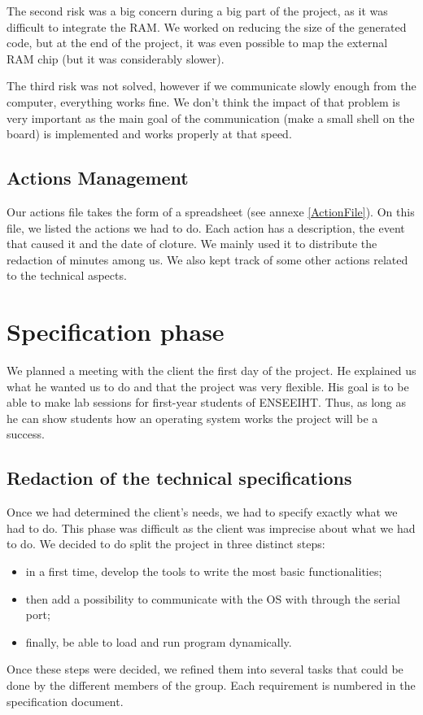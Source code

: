 \documentclass[openany, a4paper]{book}
\begin{document}
        The second risk was a big concern during a big part of the project, as
        it was difficult to integrate the RAM. We worked on reducing the size of
        the generated code, but at the end of the project, it was even possible
        to map the external RAM chip (but it was considerably slower).

        The third risk was not solved, however if we communicate slowly enough
        from the computer, everything works fine. We don't think the impact of
        that problem is very important as the main goal of the communication
        (make a small shell on the board) is implemented and works properly at
        that speed.

    \section{Actions Management}
    Our actions file takes the form of a spreadsheet (see annexe
    \ref{ActionFile}). On this file, we listed the actions we had to do. Each
    action has a description, the event that caused it and the date of cloture.
    We mainly used it to distribute the redaction of minutes among us. We also
    kept track of some other actions related to the technical aspects.

  \chapter{Specification phase}
    We planned a meeting with the client the first day of the project. He
    explained us what he wanted us to do and that the project was very flexible.
    His goal is to be able to make lab sessions for first-year students of
    ENSEEIHT. Thus, as long as he can show students how an operating system
    works the project will be a success.

    \section{Redaction of the technical specifications}
      Once we had determined the client's needs, we had to specify exactly what
      we had to do. This phase was difficult as the client was imprecise about
      what we had to do. We decided to do split the project in three distinct
      steps:
      \begin{itemize}
        \item in a first time, develop the tools to write the  most basic
            functionalities;
        \item then add a possibility to communicate with the OS with through the
          serial port;
        \item finally, be able to load and run program dynamically.
      \end{itemize}
      Once these steps were decided, we refined them into several tasks that
      could be done by the different members of the group.
      Each requirement is numbered in the specification document.
\end{document}
